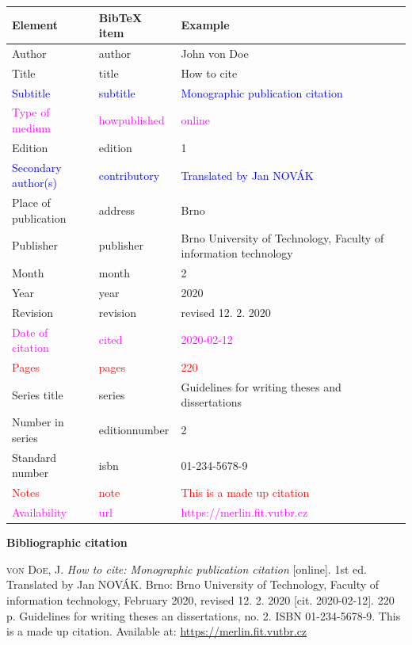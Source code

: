 \begin{tabularx}{\linewidth}{X X X}
    Element & BibTeX item & Example\\\hline
    Author & author & John von Doe\\
    Title & title & How to cite\\
    \textcolor{blue}{Subtitle} & \textcolor{blue}{subtitle} & \textcolor{blue}{Monographic publication citation}\\
    \textcolor{magenta}{Type of medium} & \textcolor{magenta}{howpublished} & \textcolor{magenta}{online}\\
    Edition & edition & 1\\
    \textcolor{blue}{Secondary author(s)} & \textcolor{blue}{contributory} & \textcolor{blue}{Translated by Jan NOVÁK}\\
    Place of publication & address & Brno\\
    Publisher & publisher & Brno University of Technology, Faculty of information technology\\
    Month & month & 2\\
    Year & year & 2020\\
    Revision & revision & revised 12. 2. 2020\\
    \textcolor{magenta}{Date of citation} & \textcolor{magenta}{cited} & \textcolor{magenta}{2020-02-12}\\
    \textcolor{red}{Pages} & \textcolor{red}{pages} & \textcolor{red}{220}\\
    Series title & series & Guidelines for writing theses and dissertations\\
    Number in series & editionnumber & 2\\
    Standard number & isbn & 01-234-5678-9\\
    \textcolor{red}{Notes} & \textcolor{red}{note} & \textcolor{red}{This is a made up citation}\\
    \textcolor{magenta}{Availability} & \textcolor{magenta}{url} & \textcolor{magenta}{https://merlin.fit.vutbr.cz}\\
\end{tabularx}

\bigskip

\noindent \textbf{Bibliographic citation}

\medskip

\noindent \textsc{von Doe}, J. \textit{How to cite: Monographic publication citation} [online]. 1st ed. Translated by Jan NOVÁK.
Brno: Brno University of Technology, Faculty of information technology, February 2020, revised 12. 2. 2020 [cit. 2020-02-12]. 220 p. Guidelines for writing theses an dissertations, no. 2. ISBN 01-234-5678-9. This is a made up citation. Available at: \url{https://merlin.fit.vutbr.cz}
\newpage
